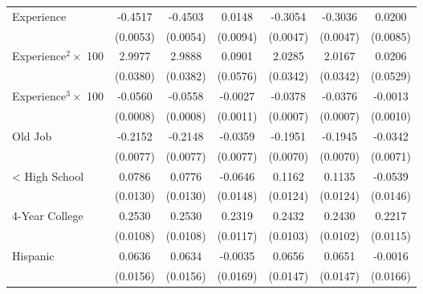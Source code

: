 {\begin{longtable}{l*{6}{c}}
Experience          &     -0.4517\sym{***}&     -0.4503\sym{***}&      0.0148         &     -0.3054\sym{***}&     -0.3036\sym{***}&      0.0200\sym{**} \\
                    &    (0.0053)         &    (0.0054)         &    (0.0094)         &    (0.0047)         &    (0.0047)         &    (0.0085)         \\
Experience$^2\times$ 100&      2.9977\sym{***}&      2.9888\sym{***}&      0.0901         &      2.0285\sym{***}&      2.0167\sym{***}&      0.0206         \\
                    &    (0.0380)         &    (0.0382)         &    (0.0576)         &    (0.0342)         &    (0.0342)         &    (0.0529)         \\
Experience$^3\times$ 100&     -0.0560\sym{***}&     -0.0558\sym{***}&     -0.0027\sym{**} &     -0.0378\sym{***}&     -0.0376\sym{***}&     -0.0013         \\
                    &    (0.0008)         &    (0.0008)         &    (0.0011)         &    (0.0007)         &    (0.0007)         &    (0.0010)         \\
Old Job             &     -0.2152\sym{***}&     -0.2148\sym{***}&     -0.0359\sym{***}&     -0.1951\sym{***}&     -0.1945\sym{***}&     -0.0342\sym{***}\\
                    &    (0.0077)         &    (0.0077)         &    (0.0077)         &    (0.0070)         &    (0.0070)         &    (0.0071)         \\
< High School       &      0.0786\sym{***}&      0.0776\sym{***}&     -0.0646\sym{***}&      0.1162\sym{***}&      0.1135\sym{***}&     -0.0539\sym{***}\\
                    &    (0.0130)         &    (0.0130)         &    (0.0148)         &    (0.0124)         &    (0.0124)         &    (0.0146)         \\
4-Year College      &      0.2530\sym{***}&      0.2530\sym{***}&      0.2319\sym{***}&      0.2432\sym{***}&      0.2430\sym{***}&      0.2217\sym{***}\\
                    &    (0.0108)         &    (0.0108)         &    (0.0117)         &    (0.0103)         &    (0.0102)         &    (0.0115)         \\
Hispanic            &      0.0636\sym{***}&      0.0634\sym{***}&     -0.0035         &      0.0656\sym{***}&      0.0651\sym{***}&     -0.0016         \\
                    &    (0.0156)         &    (0.0156)         &    (0.0169)         &    (0.0147)         &    (0.0147)         &    (0.0166)         \\

\end{longtable}}
